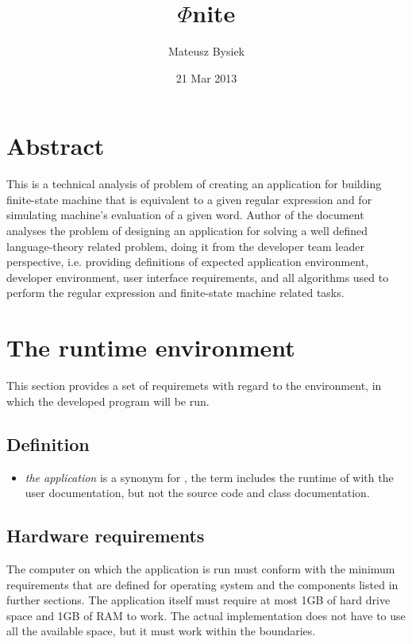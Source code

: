 \documentclass{article}
\title{$\Phi$nite}
\author{Mateusz Bysiek}
\date{21 Mar 2013}
\begin{document}


\section*{Abstract}

This is a technical analysis of problem of creating an application for building finite-state machine
that is equivalent to a given regular expression and for simulating machine's evaluation of a given
word.
Author of the document analyses the problem of designing an application for solving a well defined
language\mbox{-}theory related problem, doing it from the developer team leader perspective, i.e.
providing definitions of expected application environment, developer environment, user interface
requirements, and all algorithms used to perform the regular expression and finite-state machine
related tasks.

\section{The runtime environment}

This section provides a set of requiremets with regard to the environment, in which the developed
program will be run.

\subsection*{Definition}

\begin{itemize}

  \item \textit{the application} is a synonym for \titletext, the term includes the runtime of
  \titletext{} with the user documentation, but not the source code and class documentation.

\end{itemize}

\subsection{Hardware requirements}

The computer on which the application is run must conform with the minimum requirements that are
defined for operating system and the components listed in further sections. The application itself
must require at most 1GB of hard drive space and 1GB of RAM to work. The actual implementation does
not have to use all the available space, but it must work within the boundaries.
\end{document}

